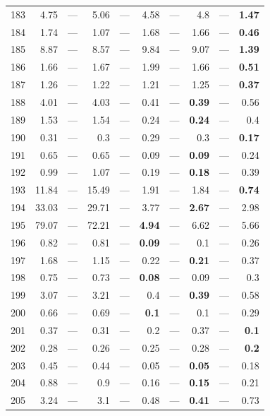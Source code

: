 \begin{longtable}{lr@{\hskip 4pt}l@{\hskip 12pt}r@{\hskip 4pt}l@{\hskip 12pt}r@{\hskip 4pt}l@{\hskip 12pt}r@{\hskip 4pt}l@{\hskip 12pt}r}
183 & 4.75 & --- & 5.06 & --- & 4.58 & --- & 4.8 & --- & \textbf{1.47} \\
184 & 1.74 & --- & 1.07 & --- & 1.68 & --- & 1.66 & --- & \textbf{0.46} \\
185 & 8.87 & --- & 8.57 & --- & 9.84 & --- & 9.07 & --- & \textbf{1.39} \\
186 & 1.66 & --- & 1.67 & --- & 1.99 & --- & 1.66 & --- & \textbf{0.51} \\
187 & 1.26 & --- & 1.22 & --- & 1.21 & --- & 1.25 & --- & \textbf{0.37} \\
188 & 4.01 & --- & 4.03 & --- & 0.41 & --- & \textbf{0.39} & --- & 0.56 \\
189 & 1.53 & --- & 1.54 & --- & 0.24 & --- & \textbf{0.24} & --- & 0.4 \\
190 & 0.31 & --- & 0.3 & --- & 0.29 & --- & 0.3 & --- & \textbf{0.17} \\
191 & 0.65 & --- & 0.65 & --- & 0.09 & --- & \textbf{0.09} & --- & 0.24 \\
192 & 0.99 & --- & 1.07 & --- & 0.19 & --- & \textbf{0.18} & --- & 0.39 \\
193 & 11.84 & --- & 15.49 & --- & 1.91 & --- & 1.84 & --- & \textbf{0.74} \\
194 & 33.03 & --- & 29.71 & --- & 3.77 & --- & \textbf{2.67} & --- & 2.98 \\
195 & 79.07 & --- & 72.21 & --- & \textbf{4.94} & --- & 6.62 & --- & 5.66 \\
196 & 0.82 & --- & 0.81 & --- & \textbf{0.09} & --- & 0.1 & --- & 0.26 \\
197 & 1.68 & --- & 1.15 & --- & 0.22 & --- & \textbf{0.21} & --- & 0.37 \\
198 & 0.75 & --- & 0.73 & --- & \textbf{0.08} & --- & 0.09 & --- & 0.3 \\
199 & 3.07 & --- & 3.21 & --- & 0.4 & --- & \textbf{0.39} & --- & 0.58 \\
200 & 0.66 & --- & 0.69 & --- & \textbf{0.1} & --- & 0.1 & --- & 0.29 \\
201 & 0.37 & --- & 0.31 & --- & 0.2 & --- & 0.37 & --- & \textbf{0.1} \\
202 & 0.28 & --- & 0.26 & --- & 0.25 & --- & 0.28 & --- & \textbf{0.2} \\
203 & 0.45 & --- & 0.44 & --- & 0.05 & --- & \textbf{0.05} & --- & 0.18 \\
204 & 0.88 & --- & 0.9 & --- & 0.16 & --- & \textbf{0.15} & --- & 0.21 \\
205 & 3.24 & --- & 3.1 & --- & 0.48 & --- & \textbf{0.41} & --- & 0.73 \\

\end{longtable}
